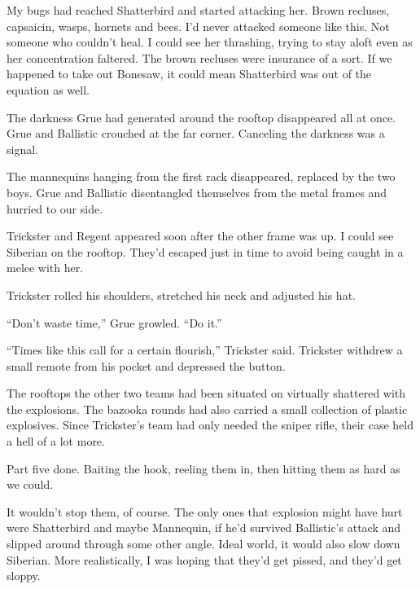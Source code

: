 My bugs had reached Shatterbird and started attacking her.  Brown recluses, capsaicin, wasps, hornets and bees.  I'd never attacked someone like this.  Not someone who couldn't heal.  I could see her thrashing, trying to stay aloft even as her concentration faltered.  The brown recluses were insurance of a sort.  If we happened to take out Bonesaw, it could mean Shatterbird was out of the equation as well.



The darkness Grue had generated around the rooftop disappeared all at once.  Grue and Ballistic crouched at the far corner.  Canceling the darkness was a signal.



The mannequins hanging from the first rack disappeared, replaced by the two boys.  Grue and Ballistic disentangled themselves from the metal frames and hurried to our side.



Trickster and Regent appeared soon after the other frame was up.  I could see Siberian on the rooftop.  They'd escaped just in time to avoid being caught in a melee with her.



Trickster rolled his shoulders, stretched his neck and adjusted his hat.



``Don't waste time,'' Grue growled.  ``Do it.''



``Times like this call for a certain flourish,'' Trickster said.  Trickster withdrew a small remote from his pocket and depressed the button.



The rooftops the other two teams had been situated on virtually shattered with the explosions.  The bazooka rounds had also carried a small collection of plastic explosives.  Since Trickster's team had only needed the sniper rifle, their case held a hell of a lot more.



Part five done.  Baiting the hook, reeling them in, then hitting them as hard as we could.



It wouldn't stop them, of course.  The only ones that explosion might have hurt were Shatterbird and maybe Mannequin, if he'd survived Ballistic's attack and slipped around through some other angle.  Ideal world, it would also slow down Siberian.  More realistically, I was hoping that they'd get pissed, and they'd get sloppy.



